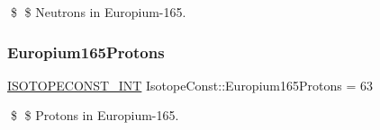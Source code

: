 \$ \$ Neutrons in Europium-\/165. \mbox{\label{group___isotope_const-_europium-_eu165_gab34be72ba3e7c7387286e3d188befaf9}} 
\subsubsection{\texorpdfstring{Europium165\+Protons}{Europium165Protons}}
{\footnotesize\ttfamily \mbox{\hyperlink{group___isotope_const-_macros_ga5f18360b3e99483a35c32d789e62621c}{I\+S\+O\+T\+O\+P\+E\+C\+O\+N\+S\+T\+\_\+\+I\+NT}} Isotope\+Const\+::\+Europium165\+Protons = 63}

\$ \$ Protons in Europium-\/165. 